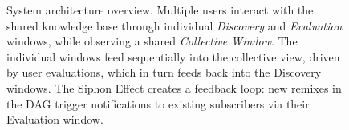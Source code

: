 \begin{figure}[htbp]
\caption{System architecture overview. Multiple users interact with the shared knowledge base through individual \textit{Discovery} and \textit{Evaluation} windows, while observing a shared \textit{Collective Window}. The individual windows feed sequentially into the collective view, driven by user evaluations, which in turn feeds back into the Discovery windows. The Siphon Effect creates a feedback loop: new remixes in the DAG trigger notifications to existing subscribers via their Evaluation window.}
\label{fig:system-architecture}
\end{figure}
